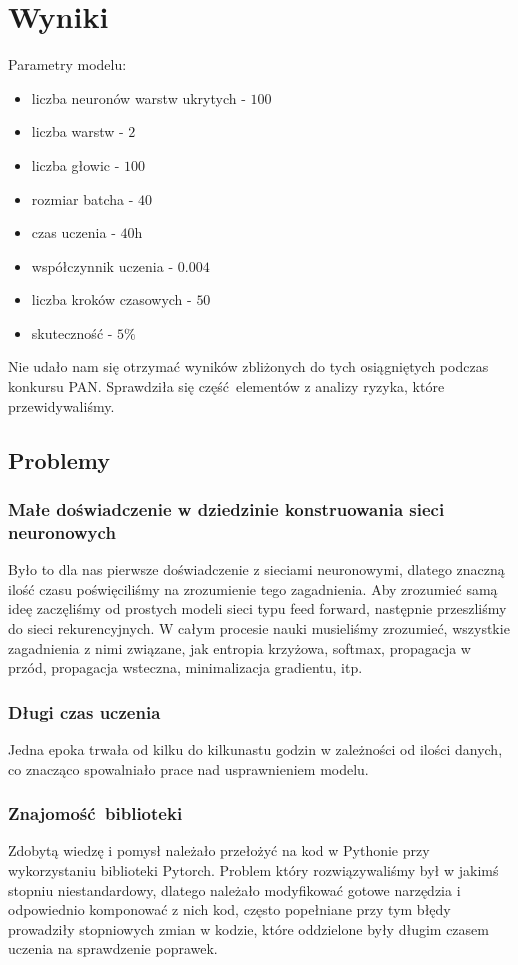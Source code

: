 \newpage
\section{Wyniki}

Parametry modelu:
\begin{itemize}
	  \item liczba neuronów warstw ukrytych - $100$
	  \item liczba warstw - $2$
	  \item liczba głowic - $100$
	  \item rozmiar batcha - $40$
	  \item czas uczenia - $40$h
	  \item współczynnik uczenia - $0.004$
	  \item liczba kroków czasowych - $50$
	  \item skuteczność - $5\%$
	\end{itemize}
	
Nie udało nam się otrzymać wyników zbliżonych do tych osiągniętych podczas konkursu PAN. Sprawdziła się
część elementów z analizy ryzyka, które przewidywaliśmy.

\subsection{Problemy}
\subsubsection{Małe doświadczenie w dziedzinie konstruowania sieci neuronowych}
Było to dla nas pierwsze doświadczenie z sieciami neuronowymi, dlatego znaczną ilość czasu poświęciliśmy na 
zrozumienie tego zagadnienia. Aby zrozumieć samą ideę zaczęliśmy od prostych modeli sieci typu feed forward,
następnie przeszliśmy do sieci rekurencyjnych. W całym procesie nauki musieliśmy zrozumieć,
wszystkie zagadnienia z nimi związane, jak entropia krzyżowa, softmax, propagacja w przód, propagacja wsteczna, 
minimalizacja gradientu, itp.
 
\subsubsection{Długi czas uczenia}
Jedna epoka trwała od kilku do kilkunastu godzin w zależności od ilości danych, co znacząco spowalniało 
prace nad usprawnieniem modelu. 
 
\subsubsection{Znajomość biblioteki}
Zdobytą wiedzę i pomysł należało przełożyć na kod w Pythonie przy wykorzystaniu biblioteki Pytorch. 
Problem który rozwiązywaliśmy był w jakimś stopniu niestandardowy, dlatego należało modyfikować 
gotowe narzędzia i odpowiednio komponować z nich kod, często popełniane przy tym błędy prowadziły 
stopniowych zmian w kodzie, które oddzielone były długim czasem uczenia na sprawdzenie poprawek.

